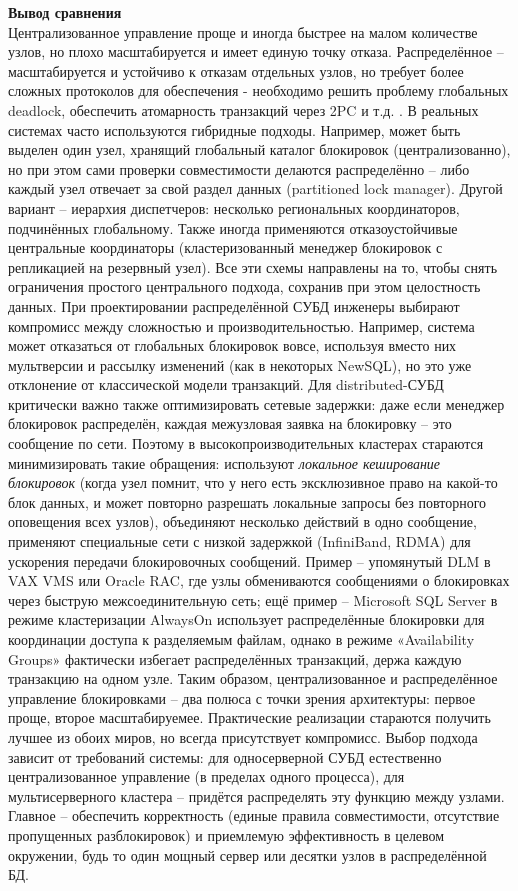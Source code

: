  \textbf{Вывод сравнения} ~\\
 
 Централизованное управление проще и иногда быстрее на малом количестве узлов, но плохо масштабируется и имеет единую точку отказа. Распределённое – масштабируется и устойчиво к отказам отдельных узлов, но требует более сложных протоколов для обеспечения - необходимо решить проблему глобальных deadlock, обеспечить атомарность транзакций через 2PC и т.д. \autocite{Silberschatz}. 
 В реальных системах часто используются гибридные подходы. Например, может быть выделен один узел, хранящий глобальный каталог блокировок (централизованно), но при этом сами проверки совместимости делаются распределённо – либо каждый узел отвечает за свой раздел данных (partitioned lock manager). 
 Другой вариант – иерархия диспетчеров: несколько региональных координаторов, подчинённых глобальному. Также иногда применяются отказоустойчивые центральные координаторы (кластеризованный менеджер блокировок с репликацией на резервный узел). Все эти схемы направлены на то, чтобы снять ограничения простого центрального подхода, сохранив при этом целостность данных. При проектировании распределённой СУБД инженеры выбирают компромисс между сложностью и производительностью. Например, система может отказаться от глобальных блокировок вовсе, используя вместо них мультверсии и рассылку изменений (как в некоторых NewSQL), но это уже отклонение от классической модели транзакций. Для distributed-СУБД критически важно также оптимизировать сетевые задержки: даже если менеджер блокировок распределён, каждая межузловая заявка на блокировку – это сообщение по сети. Поэтому в высокопроизводительных кластерах стараются минимизировать такие обращения: используют \textit{локальное кеширование блокировок} (когда узел помнит, что у него есть эксклюзивное право на какой-то блок данных, и может повторно разрешать локальные запросы без повторного оповещения всех узлов), объединяют несколько действий в одно сообщение, применяют специальные сети с низкой задержкой (InfiniBand, RDMA) для ускорения передачи блокировочных сообщений. Пример – упомянутый DLM в VAX VMS или Oracle RAC, где узлы обмениваются сообщениями о блокировках через быструю межсоединительную сеть; ещё пример – Microsoft SQL Server в режиме кластеризации AlwaysOn использует распределённые блокировки для координации доступа к разделяемым файлам, однако в режиме «Availability Groups» фактически избегает распределённых транзакций, держа каждую транзакцию на одном узле. Таким образом, централизованное и распределённое управление блокировками – два полюса с точки зрения архитектуры: первое проще, второе масштабируемее. 
 Практические реализации стараются получить лучшее из обоих миров, но всегда присутствует компромисс. Выбор подхода зависит от требований системы: для односерверной СУБД естественно централизованное управление (в пределах одного процесса), для мультисерверного кластера – придётся распределять эту функцию между узлами. Главное – обеспечить корректность (единые правила совместимости, отсутствие пропущенных разблокировок) и приемлемую эффективность в целевом окружении, будь то один мощный сервер или десятки узлов в распределённой БД.




